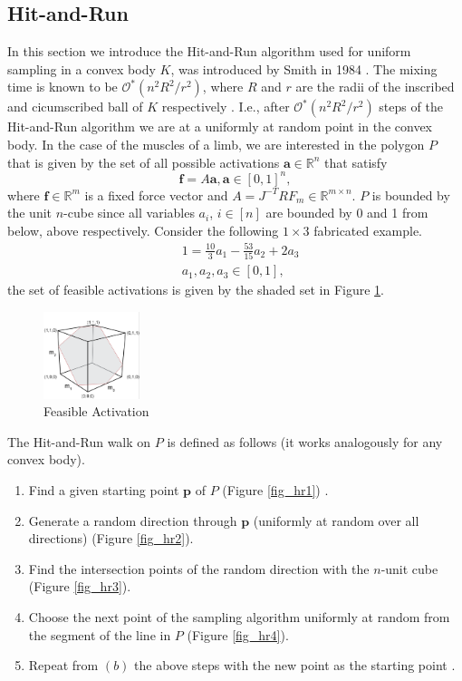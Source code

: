 \subsection{Hit-and-Run}
In this section we introduce the Hit-and-Run algorithm used for uniform sampling in a convex body $K$, was introduced by Smith in 1984 \cite{Smith}. The mixing time is known to be $\mathcal{O}^*(n^2R^2/r^2)$, where $R$ and $r$ are the radii of the inscribed and cicumscribed ball of $K$ respectively \cite{Dyer, Lovasz}. I.e., after $\mathcal{O}^*(n^2R^2/r^2)$ steps of the Hit-and-Run algorithm we are at a uniformly at random point in the convex body. 
In the case of the muscles of a limb, we are interested in the polygon $P$ that is given by the set of all possible activations $\textbf{a} \in \mathbb{R}^n$ that satisfy
\[\textbf{f} = A\textbf{a}, \textbf{a} \in [0,1]^n,\]
where $\textbf{f} \in \mathbb{R}^m$ is a fixed force vector and $A = J^{-T}RF_m \in \mathbb{R}^{m \times n}$. $P$ is bounded by the unit $n$-cube since all variables $a_i$, $i \in [n]$ are bounded by 0 and 1 from below, above respectively.
Consider the following $1 \times 3$ fabricated example.
\begin{align*}
&1 = \frac{10}{3}a_1 - \frac{53}{15}a_2 + 2a_3 \\
&a_1, a_2, a_3 \in [0,1],
\end{align*}
the set of feasible activations is given by the shaded set in Figure \ref{fig_hr}.

\begin{figure}[ht]
   \begin{center}
    \includegraphics[width=0.25\textwidth]{feasibleactivation.png}
  \end{center}
  \caption{Feasible Activation}
  \label{fig_hr}
\end{figure}

The Hit-and-Run walk on $P$ is defined as follows (it works analogously for any convex body). 
\begin{enumerate}
\item Find a given starting point $\textbf{p}$ of $P$ (Figure \ref{fig_hr1}) .
\item Generate a random direction through $\textbf{p}$ (uniformly at random over all directions) (Figure \ref{fig_hr2}).
\item Find the intersection points of the random direction with the $n$-unit cube (Figure \ref{fig_hr3}).
\item Choose the next point of the sampling algorithm uniformly at random from the segment of the line in $P$ (Figure \ref{fig_hr4}). 
\item Repeat from $(b)$ the above steps with the new point as the starting point .
\end{enumerate}


